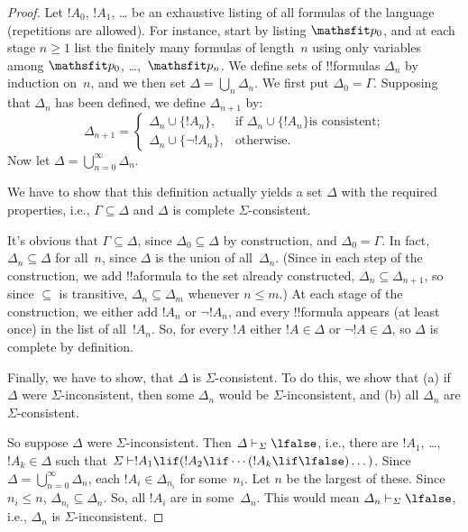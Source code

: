\documentclass[../../../include/open-logic-section]{subfiles}
\begin{document}
\begin{proof}
Let $!A_0$, $!A_1$, \dots{} be an exhaustive listing of all formulas
of the language (repetitions are allowed). For instance, start by
listing $\Obj p_0$, and at each stage $n \ge 1$ list the finitely many
formulas of length~$n$ using only variables among $\Obj p_0$,
\dots,~$\Obj p_n$. We define sets of !!{formula}s $\Delta_n$ by
induction on~$n$, and we then set $\Delta = \bigcup_n \Delta_n$. We
first put $\Delta_0 = \Gamma$. Supposing that $\Delta_n$ has been
defined, we define $\Delta_{n+1}$ by:
\[
\Delta_{n+1} =
\begin{cases}
  \Delta_n \cup \{!A_n\}, & \text{if $\Delta_n \cup \{ !A_n\}$
    is consistent;} \\
  \Delta_n \cup \{ \lnot !A_n\}, & \text{otherwise.}
\end{cases}
\]
Now let $\Delta = \bigcup_{n=0}^\infty \Delta_n$.

We have to show that this definition actually yields a set $\Delta$
with the required properties, i.e., $\Gamma \subseteq \Delta$ and
$\Delta$ is complete $\Sigma$-consistent.

It's obvious that $\Gamma \subseteq \Delta$, since $\Delta_0 \subseteq
\Delta$ by construction, and $\Delta_0 = \Gamma$. In fact, $\Delta_n
\subseteq \Delta$ for all~$n$, since $\Delta$ is the union of
all~$\Delta_n$. (Since in each step of the construction, we add
!!a{formula} to the set already constructed, $\Delta_n \subseteq
\Delta_{n+1}$, so since $\subseteq$ is transitive, $\Delta_n \subseteq
\Delta_{m}$ whenever $n \le m$.)  At each stage of the construction, we
either add $!A_n$ or $\lnot !A_n$, and every !!{formula} appears (at
least once) in the list of all~$!A_n$. So, for every $!A$ either $!A
\in \Delta$ or $\lnot !A \in \Delta$, so $\Delta$ is complete by
definition.

Finally, we have to show, that $\Delta$ is $\Sigma$-consistent.  To do
this, we show that (a) if $\Delta$ were $\Sigma$-inconsistent, then
some $\Delta_n$ would be $\Sigma$-inconsistent, and (b) all $\Delta_n$
are $\Sigma$-consistent.

So suppose $\Delta$ were $\Sigma$-inconsistent. Then $\Delta
\Proves[\Sigma] \lfalse$, i.e., there are $!A_1$, \dots,~$!A_k \in
\Delta$ such that $\Sigma \Proves !A_1 \lif (!A_2 \lif \cdots (!A_k
\lif \lfalse)\dots)$. Since $\Delta = \bigcup_{n=0}^\infty \Delta_n$, each
$!A_i \in \Delta_{n_i}$ for some~$n_i$. Let $n$ be the largest of
these. Since $n_i \le n$, $\Delta_{n_i} \subseteq \Delta_n$. So, all
$!A_i$ are in some~$\Delta_n$. This would mean $\Delta_n
\Proves[\Sigma] \lfalse$, i.e., $\Delta_n$ is $\Sigma$-inconsistent.


\end{proof}
\end{document}
